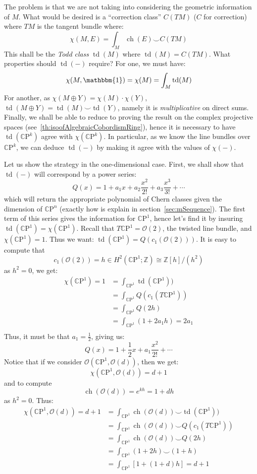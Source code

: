 \documentclass{ut-thesis}
\newcommand{\Z}{{\mathbb{Z}}}
\newcommand{\CO}{{\mathcal{O}}}
\newcommand{\CP}{{\mathbb{C}\mathrm{P}}}
\newcommand{\ch}{{\operatorname{ch}}}
\newcommand{\td}{{\operatorname{td}}}
\renewcommand{\ch}{{\operatorname{ch}}}
\begin{document}
The problem is that we are not taking into considering the geometric information of $M$. What would be desired
is a ``correction class'' $C(TM)$ ($C$ for correction) where $TM$ is the tangent bundle where:
\[
  \chi(M, E) = \int_M \ch(E) \smile C(TM)
\]
This shall be the \emph{Todd class} $\td(M)$ where $\td(M) = C(TM)$. What properties should $\td(-)$ require? For one, we must have:
\[
  \chi(M, \mathbbm{1}) = \chi(M) = \int_M \td(M)
\]
For another, as $\chi(M\oplus Y) = \chi(M)\cdot \chi(Y)$, $\td(M\oplus Y) = \td(M)\smile \td(Y)$, namely it is
\emph{multiplicative} on direct sums. Finally, we shall be able to reduce to proving the result on the complex
projective spaces (see~\cref{th:isoofAlgebraicCobordismRing}), hence
it is necessary to have $\td(\CP^k)$ agree with $\chi(\CP^k)$. In particular, as we know the line bundles over
$\CP^k$, we can deduce $\td(-)$ by making it agree with the values of $\chi(-)$.

Let us show the strategy in the one-dimensional case. First, we shall show that
$\td(-)$ will correspond by a power series:
\[
  Q(x) = 1 + a_1x + a_2\frac{x^2}{2!} + a_3 \frac{x^3}{3!} +  \cdots
\]
which will return the appropriate polynomial of Chern classes given the dimension of $\CP^n$ (exactly how is explain
in section~\ref{sec:mSequence}). The first term of this series gives the information for $\CP^1$, hence let's
find it by insuring $\td(\CP^1) = \chi(\CP^1)$. Recall that $T\CP^1 = \CO(2)$, the twisted line bundle, and
$\chi(\CP^1) = 1$. Thus we want: $\td(\CP^1) = Q\left(c_1(\CO(2))\right)$. It is easy to compute that
\[
  c_1(\CO(2)) = h \in H^2(\CP^1; \Z) \cong \Z[h]/(h^2)
\]
as $h^2 = 0$, we get:
\begin{align*}
  \chi(\CP^1) = 1 &= \int_{\CP^1} \td(\CP^1))\\
  &= \int_{\CP^1} Q(c_1(T\CP^1))\\
  &= \int_{\CP^1} Q(2h)\\
  &= \int_{\CP^1} (1 + 2a_1h) = 2a_1\\
\end{align*}
Thus, it must be that $a_1 = \frac{1}{2}$, giving us:
\[
  Q(x) = 1 + \frac{1}{2}x + a_1 \frac{x^2}{2!} + \cdots
\]
Notice that if we consider $\CO(\CP^1, \CO(d))$, then we get:
\[
  \chi(\CP^1, \CO(d)) = d+1
\]
and to compute
\[
  \ch(\CO(d)) = e^{kh} = 1 + dh
\]
as $h^2 = 0$. Thus:
\begin{align*}
  \chi(\CP^1, \CO(d)) = d+1 &= \int_{\CP^1} \ch(\CO(d)) \smile \td(\CP^1))\\
  &= \int_{\CP^1} \ch(\CO(d)) \smile Q(c_1(T\CP^1))\\
  &= \int_{\CP^1} \ch(\CO(d)) \smile Q(2h)\\
  &= \int_{\CP^1} (1+2h) \smile (1 + h)\\
  &= \int_{\CP^1} [1 + (1 + d)h] = d+1
\end{align*}
\end{document}
